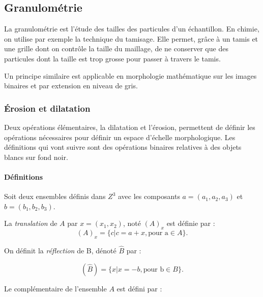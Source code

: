   
  
  \subsection{Granulométrie}
  \label{sec:EA:rehaussement:echelle:granulometrie}
  
  La granulométrie est l'étude des tailles des particules d'un échantillon. En chimie, on utilise par exemple la technique du tamisage. Elle permet, grâce à un tamis et une grille dont on contrôle la taille du maillage, de ne conserver que des particules dont la taille est trop grosse pour passer à travers le tamis.
  
  Un principe similaire est applicable en morphologie mathématique sur les images binaires et par extension en niveau de gris.
  
  \subsubsection{Érosion et dilatation}
  
  Deux opérations élémentaires, la dilatation et l'érosion, permettent de définir les opérations nécessaires pour définir un espace d'échelle morphologique. Les définitions qui vont suivre sont des opérations binaires relatives à des objets blancs sur fond noir.
  
  \paragraph{Définitions}
  Soit deux ensembles définis dans $Z^3$ avec les composants $a=(a_1,a_2,a_3)$ et $b=(b_1,b_2,b_3)$.
  
  La \emph{translation} de $A$ par $x = (x_1,x_2)$, noté $(A)_x$ est définie par :
  \begin{equation}
    (A)_x = \{c|c = a+x, \text{pour a} \in A\}. 
  \end{equation}
  
  On définit la \emph{réflection} de B, dénoté $\widehat{B}$ par :
  
  \begin{equation}
    (\widehat{B}) = \{x|x = -b, \text{pour b} \in B\}. 
  \end{equation}
  
  Le complémentaire de l'ensemble $A$ est défini par :
  
